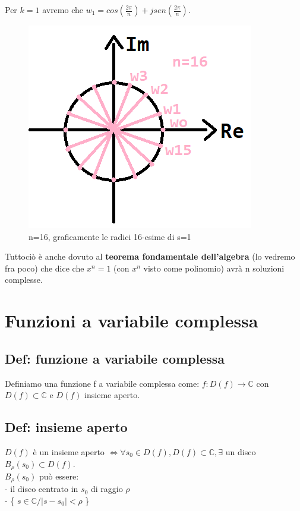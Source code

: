 Per $ k = 1$ avremo che $ w_{1} = cos(\frac{2 \pi}{n}) + j sen( \frac{2 \pi}{n}) $.\\

\begin{figure}[h]
	\centering
	\includegraphics[scale=0.5]{immagini/esempioSUnitario}
	\caption{ n=16, graficamente le radici 16-esime di s=1 }
	\label{fig: esempioRadiciSUNitario}
\end{figure}

Tuttociò è anche dovuto al \textbf{teorema fondamentale dell'algebra} (lo vedremo fra poco) che dice che $ x^{n} = 1$ (con $ x^{n}$ visto come polinomio) avrà n soluzioni complesse. \\

\section{ Funzioni a variabile complessa }

\subsection*{Def: funzione a variabile complessa}
Definiamo una funzione f a variabile complessa come:
$ f: D(f) \longrightarrow \mathbb{C} $ con $ D(f)\subset \mathbb{C} $ e $ D(f) $ insieme aperto.

\subsection*{Def: insieme aperto}
$ D(f) $ è un insieme aperto $ \Leftrightarrow \forall s_{0} \in D(f) , D(f)\subset \mathbb{C} , \exists $ un disco $ B_{\rho}(s_{0}) \subset D(f)$. \\
$ B_{\rho}(s_{0})$ può essere:\\
- il disco centrato in $ s_{0}$ di raggio $ \rho $\\
- \{ $ s \in \mathbb{C} / |s-s_{0}| < \rho $ \}\\

